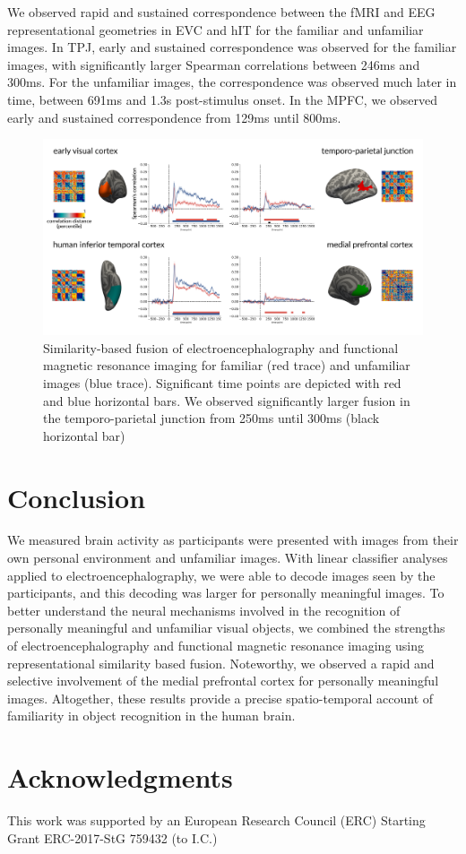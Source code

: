 \documentclass[10pt,letterpaper]{article}
\begin{document}
We observed rapid and sustained
correspondence between the fMRI and EEG representational geometries in EVC and
hIT for the familiar and unfamiliar images. In TPJ, early and sustained
correspondence was observed for the familiar images, with significantly larger
Spearman correlations between 246ms and 300ms. For the unfamiliar images, the
correspondence was observed much later in time, between 691ms and 1.3s
post-stimulus onset. In the MPFC, we observed early and sustained correspondence
from 129ms until 800ms.


\begin{figure}[t]
\begin{center}
\includegraphics[width=\linewidth]{figures/figure3.png}
\end{center}
\caption{
  Similarity-based fusion of electroencephalography and functional magnetic
  resonance imaging for familiar (red trace) and unfamiliar images (blue
  trace). Significant time points are depicted with red and blue horizontal
  bars. We observed significantly larger fusion in the temporo-parietal
  junction from 250ms until 300ms (black horizontal bar)
} 
\label{fig3}
\end{figure}

\section{Conclusion}

We measured brain activity as participants were presented with images from their
own personal environment and unfamiliar images. With linear classifier analyses
applied to electroencephalography, we were able to decode images seen by the
participants, and this decoding was larger for personally meaningful images. To
better understand the neural mechanisms involved in the recognition of
personally meaningful and unfamiliar visual objects, we combined the strengths
of electroencephalography and functional magnetic resonance imaging using
representational similarity based fusion. Noteworthy, we observed a rapid and
selective involvement of the medial prefrontal cortex for personally meaningful
images. Altogether, these results provide a precise spatio-temporal account of
familiarity in object recognition in the human brain.

\section{Acknowledgments}

This work was supported by an European Research Council (ERC) 
Starting Grant ERC-2017-StG 759432 (to I.C.)




\setlength{\bibleftmargin}{.125in}
\setlength{\bibindent}{-\bibleftmargin}


\end{document}
